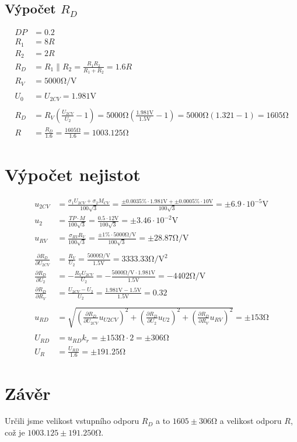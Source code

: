 \documentclass{article}
\begin{document}
\subsection{Výpočet $R_D$}
$$
\begin{aligned}
    DP &= 0.2 \\
    R_1 &= 8R \\
    R_2 &= 2R \\
    R_D &= R_1 \parallel R_2 = \frac{R_1 R_2}{R_1 + R_2} = 1.6 R \\
    R_V &= 5000 \si{\ohm\per\volt} \\
     \\
    U_0 &= U_{2CV} = 1.981 \si{\volt} \\
     \\
    R_D &= R_V (\frac{U_{2CV}}{U_2}-1)=5000\si{\ohm}(\frac{1.981 \si{\volt}}{1.5 \si{\volt}}-1) = 5000 \si{\ohm} (1.321-1)=1605 \si{\ohm}\\
    R &= \frac{R_D}{1.6} = \frac{1605 \si{\ohm}}{1.6} = 1003.125 \si{\ohm}
\end{aligned}
$$

\section{Výpočet nejistot}
$$
\begin{aligned}
    u_{2CV} &= \frac{\sigma_1 U_{2CV} + \sigma_2 M_{CV}}{100 \sqrt{3}} = \frac{\pm 0.0035 \% \cdot 1.981 \si{\volt} + \pm 0.0005 \% \cdot 10 \si{\volt}}{100 \sqrt{3}} = \pm 6.9 \cdot 10^{-5} \si{\volt} \\
    u_2 &= \frac{TP \cdot M}{100 \sqrt{3}} = \frac{0.5 \cdot 12 \si{\volt}}{100 \sqrt{3}} = \pm3.46 \cdot 10^{-2} \si{\volt} \\
    u_{RV} &= \frac{\sigma_{RV} R_V}{100 \sqrt{3}} = \frac{\pm 1 \% \cdot 5000 \si{\ohm\per\volt}}{100 \sqrt{3}} = \pm 28.87 \si{\ohm\per\volt} \\
     \\
    \frac{\partial R_D}{\partial U_{2CV}} &= \frac{R_V}{U_2} = \frac{5000 \si{\ohm\per\volt}}{1.5 \si{\volt}} = 3333.33 \si{\ohm\per\volt\squared} \\
    \frac{\partial R_D}{\partial U_2} &= -\frac{R_V U_{2CV}}{U_2} = -\frac{5000 \si{\ohm\per\volt} \cdot 1.981 \si{\volt}}{1.5 \si{\volt}} = -4402 \si{\ohm\per\volt} \\
    \frac{\partial R_D}{\partial R_V} &= \frac{U_{2CV} - U_2}{U_2} = \frac{1.981 \si{\volt} - 1.5 \si{\volt}}{1.5 \si{\volt}} = 0.32 \\
     \\
    u_{RD} &= \sqrt{(\frac{\partial R_D}{\partial U_{2CV}}u_{U2CV})^2+(\frac{\partial R_D}{\partial U_{2}}u_{U2})^2+(\frac{\partial R_D}{\partial R_{V}}u_{RV})^2} = \pm 153 \si{\ohm} \\
     \\
    U_{RD} &= u_{RD} k_r = \pm 153 \si{\ohm} \cdot 2 = \pm 306 \si{\ohm} \\
    U_{R} &= \frac{U_{RD}}{1.6} = \pm 191.25 \si{\ohm}
\end{aligned}
$$

\section{Závěr}
Určili jsme velikost vstupního odporu $R_D$ a to $1605 \pm 306 \si{\ohm}$ a velikost odporu $R$, což je $1003.125 \pm 191.250 \si{\ohm}$.
\end{document}
